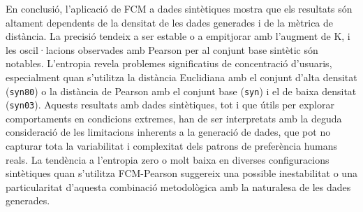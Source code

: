 \documentclass[a4paper,12pt]{report}
\begin{document}
En conclusió, l'aplicació de FCM a dades sintètiques mostra que els resultats són altament dependents de la densitat de les dades generades i de la mètrica de distància. La precisió tendeix a ser estable o a empitjorar amb l'augment de K, i les oscil·lacions observades amb Pearson per al conjunt base sintètic són notables. L'entropia revela problemes significatius de concentració d'usuaris, especialment quan s'utilitza la distància Euclidiana amb el conjunt d'alta densitat (\texttt{syn80}) o la distància de Pearson amb el conjunt base (\texttt{syn}) i el de baixa densitat (\texttt{syn03}). Aquests resultats amb dades sintètiques, tot i que útils per explorar comportaments en condicions extremes, han de ser interpretats amb la deguda consideració de les limitacions inherents a la generació de dades, que pot no capturar tota la variabilitat i complexitat dels patrons de preferència humans reals. La tendència a l'entropia zero o molt baixa en diverses configuracions sintètiques quan s'utilitza FCM-Pearson suggereix una possible inestabilitat o una particularitat d'aquesta combinació metodològica amb la naturalesa de les dades generades.
\end{document}
